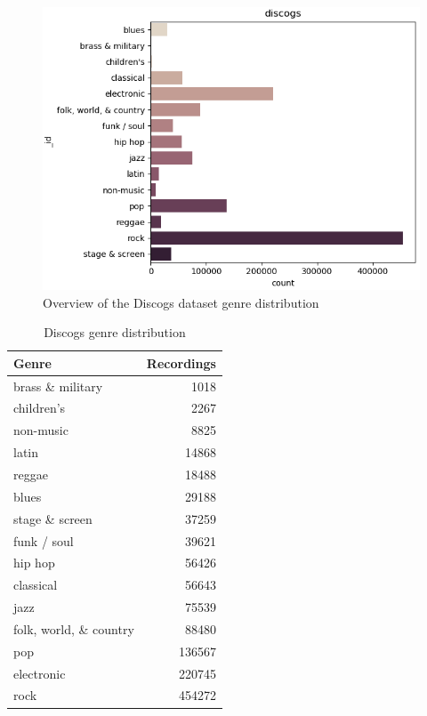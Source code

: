 \begin{figure}[!htb]
    \centering
    \includegraphics[width=1.0\textwidth]{Figures/discogs_dist.png}
    \decoRule
    \caption[Discogs distribution]{Overview of the Discogs dataset genre distribution}
    \label{fig:discogsdistfig}
\end{figure}
\begin{table}[!htb]
    \centering
    \begin{tabular}{l r} 
        \hline
        Genre & Recordings \\ [0.5ex] 
        \hline
        brass \& military & 1018 \\
        children's & 2267 \\
        non-music & 8825 \\
        latin & 14868 \\
        reggae & 18488 \\
        blues & 29188 \\
        stage \& screen & 37259 \\
        funk / soul & 39621 \\
        hip hop & 56426 \\
        classical & 56643 \\
        jazz & 75539 \\
        folk, world, \& country & 88480 \\
        pop & 136567 \\
        electronic & 220745 \\
        rock & 454272 \\
        \hline
    \end{tabular}
    \caption{Discogs genre distribution}
    \label{table:discogsdist}
\end{table}

